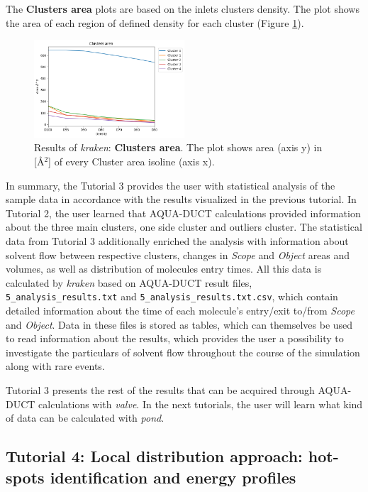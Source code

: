 \documentclass[9pt,tutorial]{livecoms}
\begin{document}
The \textbf{Clusters area} plots are based on the inlets clusters density. The plot shows the area of each region of defined density for each cluster (Figure \ref{Tut3.3}).

\begin{figure}[htb!]
\centering
\includegraphics[width=0.5\textwidth]{Tut3.3.png}
\caption{Results of \textit{kraken}: \textbf{Clusters area}. The plot shows area (axis y) in [Å\( \displaystyle ^{2}\)] of every Cluster area isoline (axis x).}
\label{Tut3.3}
\end{figure}

In summary, the Tutorial 3 provides the user with statistical analysis of the sample data in accordance with the results visualized in the previous tutorial. In Tutorial 2, the user learned that AQUA-DUCT calculations provided information about the three main clusters, one side cluster and outliers cluster. The statistical data from Tutorial 3 additionally enriched the analysis with information about solvent flow between respective clusters, changes in \textit{Scope} and \textit{Object} areas and volumes, as well as distribution of molecules entry times. All this data is calculated by \textit{kraken} based on AQUA-DUCT result files, \texttt{5\_analysis\_results.txt} and \texttt{5\_analysis\_results.txt.csv}, which contain detailed information about the time of each molecule's entry/exit to/from \textit{Scope} and \textit{Object}. Data in these files is stored as tables, which can themselves be used to read information about the results, which provides the user a possibility to investigate the particulars of solvent flow throughout the course of the simulation along with rare events. 

Tutorial 3 presents the rest of the results that can be acquired through AQUA-DUCT calculations with \textit{valve}. In the next tutorials, the user will learn what kind of data can be calculated with \textit{pond}.

\subsection{Tutorial 4: Local distribution approach: hot-spots identification and energy profiles}
\end{document}
